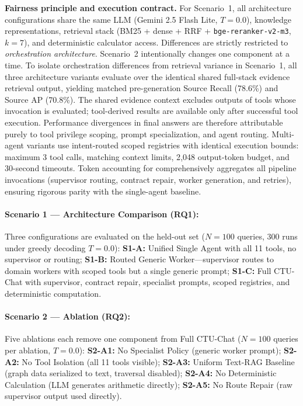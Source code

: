 \textbf{Fairness principle and execution contract.} For Scenario~1, all architecture configurations share the same LLM (Gemini 2.5 Flash Lite, $T{=}0.0$), knowledge representations, retrieval stack (BM25 + dense + RRF + \texttt{bge-reranker-v2-m3}, $k{=}7$), and deterministic calculator access. Differences are strictly restricted to \emph{orchestration architecture}. Scenario~2 intentionally changes one component at a time. To isolate orchestration differences from retrieval variance in Scenario~1, all three architecture variants evaluate over the identical shared full-stack evidence retrieval output, yielding matched pre-generation Source Recall (78.6\%) and Source AP (70.8\%). The shared evidence context excludes outputs of tools whose invocation is evaluated; tool-derived results are available only after successful tool execution. Performance divergences in final answers are therefore attributable purely to tool privilege scoping, prompt specialization, and agent routing. Multi-agent variants use intent-routed scoped registries with identical execution bounds: maximum 3 tool calls, matching context limits, 2{,}048 output-token budget, and 30-second timeouts. Token accounting for \system{} comprehensively aggregates all pipeline invocations (supervisor routing, contract repair, worker generation, and retries), ensuring rigorous parity with the single-agent baseline.

\paragraph{Scenario 1 --- Architecture Comparison (RQ1):}
Three configurations are evaluated on the held-out set ($N{=}100$ queries, 300 runs under greedy decoding $T{=}0.0$):
\textbf{S1-A:} Unified Single Agent with all 11 tools, no supervisor or routing;
\textbf{S1-B:} Routed Generic Worker---supervisor routes to domain workers with scoped tools but a single generic prompt;
\textbf{S1-C:} Full CTU-Chat with supervisor, contract repair, specialist prompts, scoped registries, and deterministic computation.

\paragraph{Scenario 2 --- Ablation (RQ2):}
Five ablations each remove one component from Full CTU-Chat ($N{=}100$ queries per ablation, $T{=}0.0$):
\textbf{S2-A1:} No Specialist Policy (generic worker prompt);
\textbf{S2-A2:} No Tool Isolation (all 11 tools visible);
\textbf{S2-A3:} Uniform Text-RAG Baseline (graph data serialized to text, traversal disabled);
\textbf{S2-A4:} No Deterministic Calculation (LLM generates arithmetic directly);
\textbf{S2-A5:} No Route Repair (raw supervisor output used directly).

